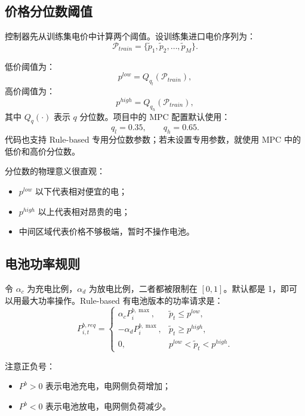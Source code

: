 \documentclass[UTF8,zihao=-4]{ctexart}
\begin{document}
\subsection{价格分位数阈值}

控制器先从训练集电价中计算两个阈值。设训练集进口电价序列为：
\begin{equation}
\mathcal{P}_{train}=\{\tilde p_1,\tilde p_2,\dots,\tilde p_M\}.
\end{equation}

低价阈值为：
\begin{equation}
p^{low}=Q_{q_l}(\mathcal{P}_{train}),
\end{equation}
高价阈值为：
\begin{equation}
p^{high}=Q_{q_h}(\mathcal{P}_{train}),
\end{equation}
其中 $Q_q(\cdot)$ 表示 $q$ 分位数。项目中的 MPC 配置默认使用：
\begin{equation}
q_l=0.35,\qquad q_h=0.65.
\end{equation}
代码也支持 Rule-based 专用分位数参数；若未设置专用参数，就使用 MPC 中的低价和高价分位数。

分位数的物理意义很直观：
\begin{itemize}
  \item $p^{low}$ 以下代表相对便宜的电；
  \item $p^{high}$ 以上代表相对昂贵的电；
  \item 中间区域代表价格不够极端，暂时不操作电池。
\end{itemize}

\subsection{电池功率规则}

令 $\alpha_c$ 为充电比例，$\alpha_d$ 为放电比例，二者都被限制在 $[0,1]$。默认都是 1，即可以用最大功率操作。Rule-based 有电池版本的功率请求是：
\begin{equation}
P^{b,req}_{i,t}=
\begin{cases}
\alpha_c P^{b,\max}_i, & \tilde p_t\le p^{low},\\
-\alpha_d P^{b,\max}_i, & \tilde p_t\ge p^{high},\\
0, & p^{low}<\tilde p_t<p^{high}.
\end{cases}
\end{equation}

注意正负号：
\begin{itemize}
  \item $P^b>0$ 表示电池充电，电网侧负荷增加；
  \item $P^b<0$ 表示电池放电，电网侧负荷减少。
\end{itemize}
\end{document}
